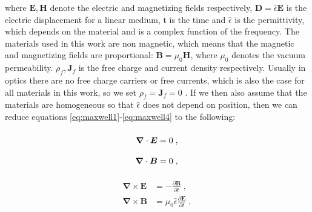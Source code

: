 where $\bm{E}, \bm{H}$ denote the electric and magnetizing fields respectively,  $\bm{D}=\hat{\epsilon} \bm{E}$ is the electric displacement for a linear medium, t is the time and $\hat{\epsilon}$ is the permittivity, which depends on the material and is a complex function of the frequency. The materials used in this work are non magnetic, which means that the magnetic and magnetizing fields are proportional: $\bm{B} = \mu_0 \bm{H}$, where $\mu_0$ denotes the vacuum permeability. $\rho_f, \bm{J}_f$ is the free charge and current density respectively. Usually in optics there are no free charge carriers or free currents, which is also the case for all materials in this work, so we set $\rho_f=\bm{J}_f=0$ \cite{Roth2019Optik}. If we then also assume that the materials are homogeneous so that $\hat{\epsilon}$ does not depend on position, then we can reduce equations \ref{eq:maxwell1}-\ref{eq:maxwell4} to the following:

\noindent\begin{minipage}{.5\linewidth}
\begin{align}
    \bm{\nabla}\cdot \bm{E} &=0\;,\label{eq:maxwell1reduced}
    \vphantom{\frac{\partial\bm{B}}{\partial t}}\\
    \bm{\nabla}\cdot\bm{B} &=0\;,\vphantom{\frac{\partial\bm{B}}{\partial t}}\label{eq:maxwell2reduced}
\end{align}
\end{minipage}%
\begin{minipage}{.5\linewidth}
\begin{align}
    \bm{\nabla}\times\bm{E} &=-\frac{\partial\bm{B}}{\partial t}\;,\label{eq:maxwell3reduced}
    \\
    \bm{\nabla}\times\bm{B} &=\mu_0 \hat{\epsilon} \frac{\partial\bm{E}}{\partial t}\;,\label{eq:maxwell4reduced}
\end{align}
\end{minipage}
\newline

